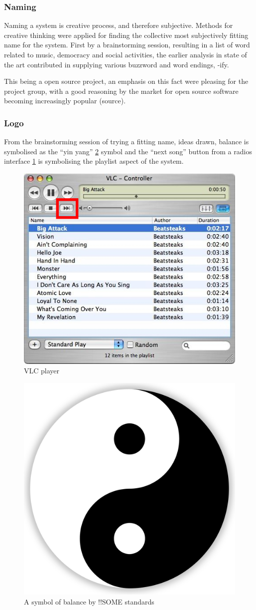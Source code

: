 
\subsubsection{Naming}
Naming a system is creative process, and therefore subjective. Methods for creative thinking were applied for finding the collective most subjectively fitting name for the system. First by a brainstorming session, resulting in a list of word related to music, democracy and social activities, the earlier analysis in state of the art contributed in supplying various buzzword and word endings, -ify.

This being a open source project, an emphasis on this fact were pleasing for the project group, with a good reasoning by the market for open source software becoming increasingly popular (source).

\subsubsection{Logo}
From the brainstorming session of trying a fitting name, ideas drawn, balance is symbolised as the \enquote{yin yang} \cref{fig:yinyang} symbol and the \enquote{next song} button from a radios interface \cref{fig:vlc} is symbolising the playlist aspect of the system.

\begin{figure}
  \centering
  \includegraphics[width=0.5\linewidth]{Images/vlc.jpg}
  \caption{VLC player}
  \label{fig:vlc}
\end{figure}

\begin{figure}
  \centering
  \includegraphics[width=0.5\linewidth]{Images/Yin-Yang.png}
  \caption{A symbol of balance by !!SOME standards}
  \label{fig:yinyang}
\end{figure}

